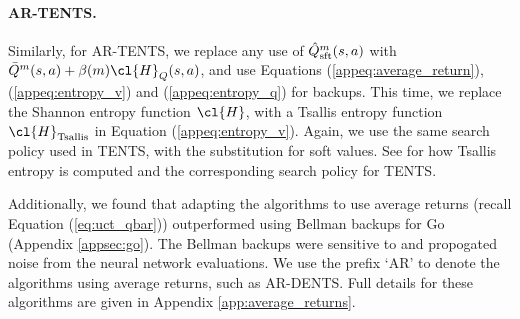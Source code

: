     \paragraph{AR-TENTS.} Similarly, for AR-TENTS, we replace any use of $\hat{Q}^m_{\textnormal{sft}}(s,a)$ with $\bar{Q}^m(s,a)+\beta(m)\cl{H}_Q(s,a)$, and use Equations (\ref{appeq:average_return}), (\ref{appeq:entropy_v}) and (\ref{appeq:entropy_q}) for backups. This time, we replace the Shannon entropy function $\cl{H}$, with a Tsallis entropy function $\cl{H}_{\textnormal{Tsallis}}$ in Equation (\ref{appeq:entropy_v}). Again, we use the same search policy used in TENTS, with the substitution for soft values. See %
        for how Tsallis entropy is computed and the corresponding search policy for TENTS. 


    Additionally, we found that adapting the algorithms to use average returns (recall Equation (\ref{eq:uct_qbar})) outperformed using Bellman backups for Go (Appendix \ref{appsec:go}). The Bellman backups were sensitive to and propogated noise from the neural network evaluations. We use the prefix `AR' to denote the algorithms using average returns, such as AR-DENTS. Full details for these algorithms are given in Appendix \ref{app:average_returns}.

